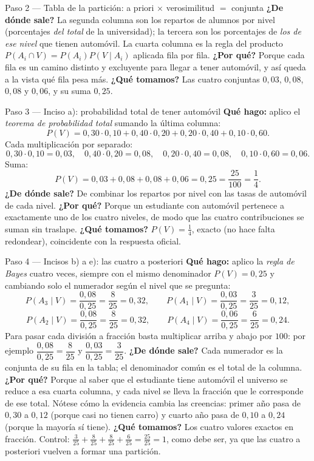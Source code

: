 \documentclass[11pt]{article}
\begin{document}
\begin{sol}
\begin{paso}{Paso 2 --- Tabla de la partición: a priori $\times$ verosimilitud $=$ conjunta}
\textbf{¿De dónde sale?} La segunda columna son los repartos de alumnos por nivel (porcentajes \emph{del total} de la universidad); la tercera son los porcentajes de \emph{los de ese nivel} que tienen automóvil. La cuarta columna es la regla del producto $P(A_i\cap V)=P(A_i)P(V\mid A_i)$ aplicada fila por fila.
\textbf{¿Por qué?} Porque cada fila es un camino distinto y excluyente para llegar a tener automóvil, y así queda a la vista qué fila pesa más.
\textbf{¿Qué tomamos?} Las cuatro conjuntas $0,03$, $0,08$, $0,08$ y $0,06$, y su suma $0,25$.
\end{paso}

\begin{paso}{Paso 3 --- Inciso a): probabilidad total de tener automóvil}
\textbf{Qué hago:} aplico el \emph{teorema de probabilidad total} sumando la última columna:
\[
P(V)=0,30\cdot 0,10+0,40\cdot 0,20+0,20\cdot 0,40+0,10\cdot 0,60.
\]
Cada multiplicación por separado:
\[
0,30\cdot 0,10=0,03,\quad 0,40\cdot 0,20=0,08,\quad 0,20\cdot 0,40=0,08,\quad 0,10\cdot 0,60=0,06.
\]
Suma:
\[
P(V)=0,03+0,08+0,08+0,06=0,25=\frac{25}{100}=\frac14 .
\]
\textbf{¿De dónde sale?} De combinar los repartos por nivel con las tasas de automóvil de cada nivel.
\textbf{¿Por qué?} Porque un estudiante con automóvil pertenece a exactamente uno de los cuatro niveles, de modo que las cuatro contribuciones se suman sin traslape.
\textbf{¿Qué tomamos?} $P(V)=\tfrac14$, exacto (no hace falta redondear), coincidente con la respuesta oficial.
\end{paso}

\begin{paso}{Paso 4 --- Incisos b) a e): las cuatro a posteriori}
\textbf{Qué hago:} aplico la \emph{regla de Bayes} cuatro veces, siempre con el mismo denominador $P(V)=0,25$ y cambiando solo el numerador según el nivel que se pregunta:
\[
P(A_3\mid V)=\frac{0,08}{0,25}=\frac{8}{25}=0,32,
\qquad
P(A_1\mid V)=\frac{0,03}{0,25}=\frac{3}{25}=0,12,
\]
\[
P(A_2\mid V)=\frac{0,08}{0,25}=\frac{8}{25}=0,32,
\qquad
P(A_4\mid V)=\frac{0,06}{0,25}=\frac{6}{25}=0,24 .
\]
Para pasar cada división a fracción basta multiplicar arriba y abajo por $100$: por ejemplo $\dfrac{0,08}{0,25}=\dfrac{8}{25}$ y $\dfrac{0,03}{0,25}=\dfrac{3}{25}$.
\textbf{¿De dónde sale?} Cada numerador es la conjunta de su fila en la tabla; el denominador común es el total de la columna.
\textbf{¿Por qué?} Porque al saber que el estudiante tiene automóvil el universo se reduce a esa cuarta columna, y cada nivel se lleva la fracción que le corresponde de ese total. Nótese cómo la evidencia cambia las creencias: primer año pasa de $0,30$ a $0,12$ (porque casi no tienen carro) y cuarto año pasa de $0,10$ a $0,24$ (porque la mayoría sí tiene).
\textbf{¿Qué tomamos?} Los cuatro valores exactos en fracción. Control: $\tfrac{3}{25}+\tfrac{8}{25}+\tfrac{8}{25}+\tfrac{6}{25}=\tfrac{25}{25}=1$, como debe ser, ya que las cuatro a posteriori vuelven a formar una partición.
\end{paso}


\end{sol}
\end{document}
